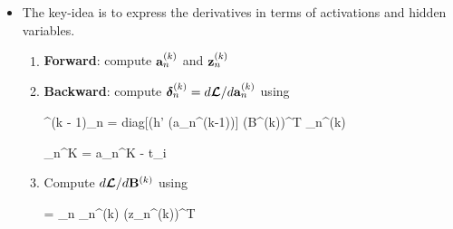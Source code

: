 \begin{itemize}
    \item The key-idea is to express the derivatives in terms of activations and hidden variables.
    \begin{enumerate}
    	\item \textbf{Forward}: compute $\mathbf{a}_n^{(k)}$ and $\mathbf{z}_n^{(k)}$
    	\item \textbf{Backward}: compute $\bm \delta_n^{(k)} = d \bm {\mathcal{L}} / d \mathbf{a}_n^{(k)}$ using 
    	\begin{myalign*}
    	    \bm \delta^{(k - 1)}_n = diag[(h' (\*a_n^{(k-1)})] (\*B^{(k)})^T \bm \delta_n^{(k)}
    	\end{myalign*}
    	\begin{myalign*}
    	    \bm \delta_n^{K} = \* a_n^{K} - t_i
    	\end{myalign*}
    	\item Compute $d \bm {\mathcal{L}} / d \mathbf{B}^{(k)}$ using 
    	\begin{myalign*}
    	     = \sum_n \bm \delta_n^{(k)} (\*z_n^{(k)})^T
    	\end{myalign*}
    \end{enumerate}
\end{itemize}

